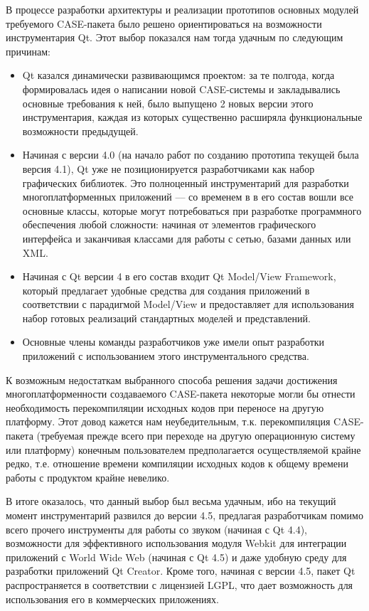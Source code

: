 \documentclass[a5paper]{article}
\begin{document}
В процессе разработки архитектуры и реализации прототипов основных
модулей требуемого CASE-пакета было решено
ориентироваться на возможности инструментария
Qt. Этот выбор показался нам тогда удачным
по следующим причинам:

\begin{itemize}
  \item Qt казался динамически развивающимся
	проектом: за те полгода, когда формировалась идея о написании новой
	CASE-системы и закладывались основные
	требования к ней, было выпущено 2 новых версии этого инструментария,
	каждая из которых существенно расширяла функциональные возможности
	предыдущей.
  \item 
	Начиная с версии 4.0 (на начало работ по созданию прототипа текущей была
	версия 4.1), Qt уже не позиционируется
	разработчиками как набор графических библиотек. Это полноценный
	инструментарий для разработки многоплатформенных приложений –-- со
	временем в в его состав вошли все основные классы, которые могут
	потребоваться при разработке программного обеспечения любой сложности:
	начиная от элементов графического интерфейса и заканчивая классами для
	работы с сетью, базами данных или XML.
  \item Начиная с Qt версии 4 в его состав входит Qt Model/View
	Framework, который предлагает удобные
	средства для создания приложений в соответствии с парадигмой
	Model/View и предоставляет для использования набор готовых реализаций стандартных
	моделей и представлений.
  \item Основные члены команды разработчиков уже имели опыт разработки
	приложений с использованием этого инструментального средства.
\end{itemize}

К возможным недостаткам выбранного способа решения задачи достижения
многоплатформенности создаваемого CASE-пакета некоторые могли бы отнести
необходимость перекомпиляции исходных кодов при переносе на другую
платформу. Этот довод кажется нам неубедительным, т.к. перекомпиляция
CASE-пакета (требуемая прежде всего при переходе на другую операционную систему или платформу) конечным
пользователем предполагается осуществляемой крайне редко, т.е.
отношение времени компиляции исходных кодов к общему времени работы с
продуктом крайне невелико.

В итоге оказалось, что данный выбор был весьма удачным, ибо на текущий
момент инструментарий развился до версии 4.5, предлагая разработчикам
помимо всего прочего инструменты для работы со звуком (начиная с
Qt 4.4), возможности для эффективного использования модуля Webkit для интеграции
приложений с World Wide Web (начиная с Qt 4.5) и даже удобную среду для
разработки приложений Qt Creator. Кроме того, начиная с версии 4.5,
пакет Qt распространяется в соответствии с лицензией LGPL, что дает возможность для
использования его в коммерческих приложениях.
\end{document}
